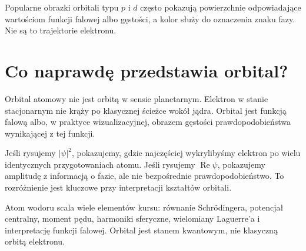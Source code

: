 Popularne obrazki orbitali typu \(p\) i \(d\) często pokazują powierzchnie odpowiadające wartościom funkcji falowej albo gęstości, a kolor służy do oznaczenia znaku fazy. Nie są to trajektorie elektronu.

\section{Co naprawdę przedstawia orbital?}

Orbital atomowy nie jest orbitą w sensie planetarnym. Elektron w stanie stacjonarnym nie krąży po klasycznej ścieżce wokół jądra. Orbital jest funkcją falową albo, w praktyce wizualizacyjnej, obrazem gęstości prawdopodobieństwa wynikającej z tej funkcji.

Jeśli rysujemy \(|\psi|^2\), pokazujemy, gdzie najczęściej wykrylibyśmy elektron po wielu identycznych przygotowaniach atomu. Jeśli rysujemy \(\operatorname{Re}\psi\), pokazujemy amplitudę z informacją o fazie, ale nie bezpośrednie prawdopodobieństwo. To rozróżnienie jest kluczowe przy interpretacji kształtów orbitali.

\begin{summarybox}
Atom wodoru scala wiele elementów kursu: równanie Schrödingera, potencjał centralny, moment pędu, harmoniki sferyczne, wielomiany Laguerre'a i interpretację funkcji falowej. Orbital jest stanem kwantowym, nie klasyczną orbitą elektronu.
\end{summarybox}
